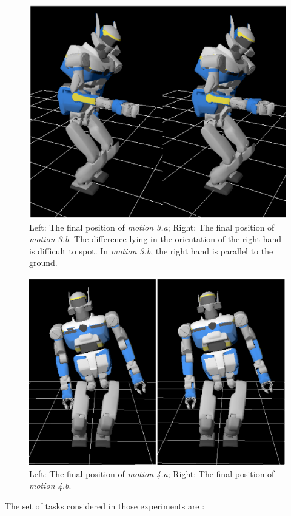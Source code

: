 \documentclass[journal]{IEEEtran}
\begin{document}
\begin{figure}[t]
\begin{center}
\includegraphics[width=0.55\linewidth]{img/final3.ps}
\end{center}
\caption{Left: The final position of \emph{motion 3.a}; Right: The final position of \emph{motion 3.b}.
The difference lying in the orientation of the right hand is difficult to spot. In \emph{motion 3.b},
the right hand is parallel to the ground.}
\label{fig:spotDiff2}
\vspace{-3pt}
\end{figure}
\begin{figure}[t]
\begin{center}
\includegraphics[width=0.66\linewidth]{img/spotDiff3.ps}
\end{center}
\caption{Left: The final position of \emph{motion 4.a}; Right: The final position of \emph{motion 4.b}.}
\label{fig:spotDiff3}
\end{figure}

The set of tasks considered in those experiments are :
\end{document}
